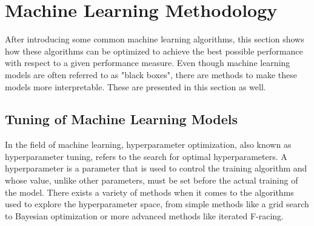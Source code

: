 \section{Machine Learning Methodology}\label{sec:methods}
After introducing some common machine learning algorithms, this section shows how these algorithms can be optimized to achieve the best possible performance with respect to a given performance measure. Even though machine learning models are often referred to as "black boxes", there are methods to make these models more interpretable. These are presented in this section as well.
\subsection{Tuning of Machine Learning Models}
In the field of machine learning, hyperparameter optimization, also known as hyperparameter tuning, refers to the search for optimal hyperparameters. A hyperparameter is a parameter that is used to control the training algorithm and whose value, unlike other parameters, must be set before the actual training of the model. There exists a variety of methods when it comes to the algorithms used to explore the hyperparameter space, from simple methods like a grid search to Bayesian optimization or more advanced methods like iterated F-racing.
